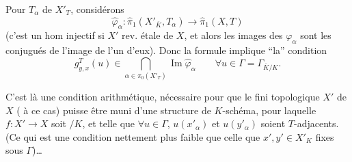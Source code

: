 Pour   $T_\alpha$ de $X'_T$, considérons
\[
\widehat\varphi_\alpha:\widehat\pi_1(X'_{\overline K},T_\alpha)\longrightarrow\widehat\pi_1(X,T)
\]
(c'est un hom injectif si $X'$ rev. étale de $X$, et alors les  images des $\varphi_\alpha$ sont les conjugués de l'image de l'un d'eux). Donc  la formule implique ``la'' condition 
\[
g^T_{y,x}(u)\in\bigcap_{\alpha\in\pi_0(X'_T)}\operatorname{Im}\widehat\varphi_\alpha
\qquad\forall u\in\Gamma=\Gamma_{\overline K/K}.
\]

C'est là une condition arithmétique, nécessaire pour que le  fini  topologique $X'$ de $X$ ( à ce cas) puisse  être muni d'une  structure de $K$-schéma, pour laquelle $f:X'\to X$ soit $ /K$, et telle que  $\forall u\in\Gamma$, $u(x'_\alpha)$ et $u(y'_\alpha)$ soient $T$-adjacents. (Ce qui est une condition nettement plus faible que celle que $x',y'\in X'_K$  fixes sous $\Gamma$)\ldots
{}
